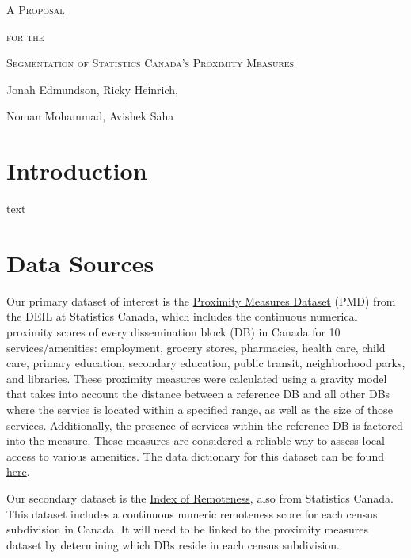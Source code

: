 \documentclass[11pt, a4paper]{article}
\begin{document}
\begin{center}
\Large{\textsc{A Proposal}}
\par
\small{\textsc{for the}}
\par
\Large{\textsc{Segmentation of Statistics Canada’s Proximity Measures}}
\par
\vspace{1.5pc}
\par
\small
Jonah Edmundson, Ricky Heinrich, \par Noman Mohammad, Avishek Saha 
\end{center}
\vspace{2pc} %
\normalsize



\section*{Introduction}

text 






\section*{Data Sources}

Our primary dataset of interest is the \href{https://www150.statcan.gc.ca/n1/pub/17-26-0002/2020001/csv/pmd-eng.zip}{Proximity Measures Dataset} (PMD) from the DEIL at Statistics Canada, which includes the continuous numerical proximity scores of every dissemination block (DB) in Canada for 10 services/amenities: employment, grocery stores, pharmacies, health care, child care, primary education, secondary education, public transit, neighborhood parks, and libraries. These proximity measures were calculated using a gravity model that takes into account the distance between a reference DB and all other DBs where the service is located within a specified range, as well as the size of those services. Additionally, the presence of services within the reference DB is factored into the measure. These measures are considered a reliable way to assess local access to various amenities. The data dictionary for this dataset can be found \href{https://www150.statcan.gc.ca/n1/pub/71-607-x/71-607-x2020011-eng.htm}{here}. 
\par
Our secondary dataset is the \href{https://www150.statcan.gc.ca/n1/pub/17-26-0001/172600012020001-eng.htm}{Index of Remoteness}, also from Statistics Canada. This dataset includes a continuous numeric remoteness score for each census subdivision in Canada. It will need to be linked to the proximity measures dataset by determining which DBs reside in each census subdivision. 
\end{document}
